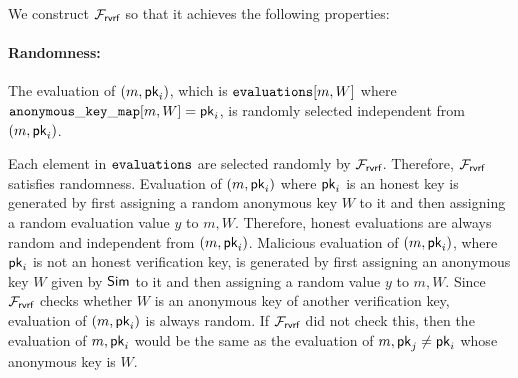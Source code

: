 %
%
We construct $ \mathcal{F}_{\textsf{rvrf}} $ so that it achieves the following properties:

\paragraph{Randomness:}  The evaluation of $ (m, \mathsf{pk}_i) $,  which is $ \texttt{evaluations}[m,W] $ where $ \mathtt{anonymous\_key\_map}[m,W] = \mathsf{pk}_i $, is randomly selected independent from $ (m, \mathsf{pk}_i) $.


Each element in $ \texttt{evaluations} $ are selected randomly by $ \mathcal{F}_{\textsf{rvrf}} $. Therefore, $ \mathcal{F}_{\textsf{rvrf}} $ satisfies randomness.  Evaluation of $ (m, \mathsf{pk}_i) $ where $ \mathsf{pk}_i $ is an honest key is generated by first assigning a random anonymous key $ W $ to it and then assigning a random evaluation value $ y $ to $ m, W $. Therefore, honest evaluations are always random and independent from $ (m,\mathsf{pk}_i) $. Malicious evaluation of $ (m, \mathsf{pk}_i) $, where $ \mathsf{pk}_i $ is not an honest verification key, is generated by first assigning an anonymous key $ W $ given by $ \mathsf{Sim} $ to it and then assigning a random value $ y $ to $ m, W $. Since $ \mathcal{F}_{\textsf{rvrf}} $ checks whether $ W $ is an anonymous key of another verification key, evaluation of $ (m, \mathsf{pk}_i) $ is always random. If $ \mathcal{F}_{\textsf{rvrf}} $ did not check this, then the evaluation of $ m, \mathsf{pk}_i $ would be the same as the evaluation of $ m, \mathsf{pk}_j  \neq \mathsf{pk}_i$ whose anonymous key is $ W $.





